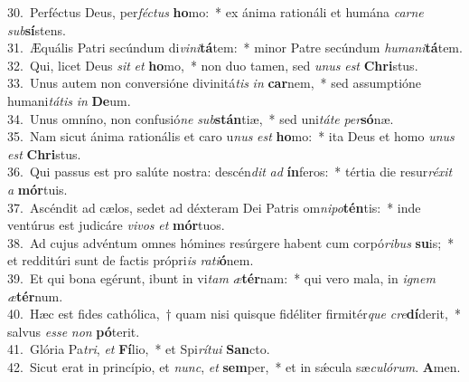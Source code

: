 {30.~}Perféctus Deus, per\textit{fé}\textit{ctus} \textbf{ho}mo:~* ex ánima rationáli et humána \textit{car}\textit{ne} \textit{sub}\textbf{sí}stens.\\
{31.~}Æquális Patri secúndum di\textit{vi}\textit{ni}\textbf{tá}tem:~* minor Patre secúndum \textit{hu}\textit{ma}\textit{ni}\textbf{tá}tem.\\
{32.~}Qui, licet Deus \textit{sit} \textit{et} \textbf{ho}mo,~* non duo tamen, sed \textit{u}\textit{nus} \textit{est} \textbf{Chri}stus.\\
{33.~}Unus autem non conversióne divinitá\textit{tis} \textit{in} \textbf{car}nem,~* sed assumptióne humani\textit{tá}\textit{tis} \textit{in} \textbf{De}um.\\
{34.~}Unus omníno, non confusió\textit{ne} \textit{sub}\textbf{stán}tiæ,~* sed uni\textit{tá}\textit{te} \textit{per}\textbf{só}næ.\\
{35.~}Nam sicut ánima rationális et caro u\textit{nus} \textit{est} \textbf{ho}mo:~* ita Deus et homo \textit{u}\textit{nus} \textit{est} \textbf{Chri}stus.\\
{36.~}Qui passus est pro salúte nostra: descén\textit{dit} \textit{ad} \textbf{ín}feros:~* tértia die resur\textit{ré}\textit{xit} \textit{a} \textbf{mór}tuis.\\
{37.~}Ascéndit ad cælos, sedet ad déxteram Dei Patris om\textit{ni}\textit{po}\textbf{tén}tis:~* inde ventúrus est judicáre \textit{vi}\textit{vos} \textit{et} \textbf{mór}tuos.\\
{38.~}Ad cujus advéntum omnes hómines resúrgere habent cum corpó\textit{ri}\textit{bus} \textbf{su}is;~* et redditúri sunt de factis própri\textit{is} \textit{ra}\textit{ti}\textbf{ó}nem.\\
{39.~}Et qui bona egérunt, ibunt in vi\textit{tam} \textit{æ}\textbf{tér}nam:~* qui vero mala, in \textit{i}\textit{gnem} \textit{æ}\textbf{tér}num.\\
{40.~}Hæc est fides cathólica,~† quam nisi quisque fidéliter firmitér\textit{que} \textit{cre}\textbf{dí}derit,~* salvus \textit{es}\textit{se} \textit{non} \textbf{pó}terit.\\
{41.~}Glória Pa\textit{tri}, \textit{et} \textbf{Fí}lio,~* et Spi\textit{rí}\textit{tu}\textit{i} \textbf{San}cto.\\
{42.~}Sicut erat in princípio, et \textit{nunc}, \textit{et} \textbf{sem}per,~* et in sǽcula sæ\textit{cu}\textit{ló}\textit{rum}. \textbf{A}men.\\
